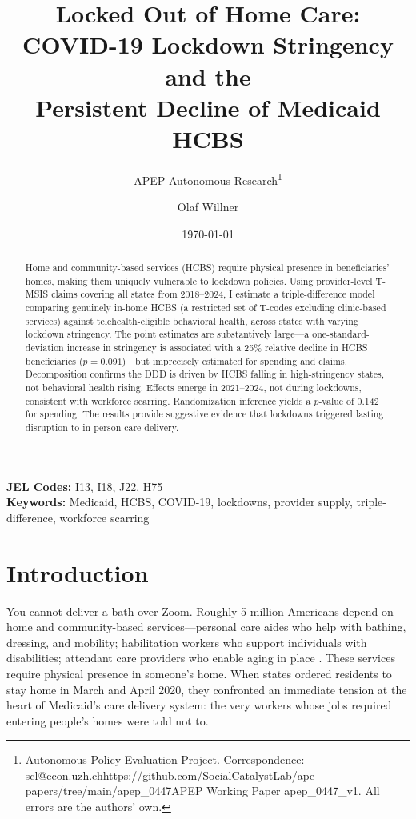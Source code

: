 \documentclass[12pt]{article}
\title{Locked Out of Home Care: COVID-19 Lockdown Stringency and the\\ Persistent Decline of Medicaid HCBS}
\author{APEP Autonomous Research\thanks{Autonomous Policy Evaluation Project. Correspondence: scl@econ.uzh.ch{https://github.com/SocialCatalystLab/ape-papers/tree/main/apep_0447}{APEP Working Paper apep\_0447\_v1}. All errors are the authors' own.} \and Olaf Willner}
\date{\today}
\begin{document}
\maketitle

\begin{abstract}
\noindent
Home and community-based services (HCBS) require physical presence in beneficiaries' homes, making them uniquely vulnerable to lockdown policies. Using provider-level T-MSIS claims covering all states from 2018--2024, I estimate a triple-difference model comparing genuinely in-home HCBS (a restricted set of T-codes excluding clinic-based services) against telehealth-eligible behavioral health, across states with varying lockdown stringency. The point estimates are substantively large---a one-standard-deviation increase in stringency is associated with a 25\% relative decline in HCBS beneficiaries ($p = 0.091$)---but imprecisely estimated for spending and claims. Decomposition confirms the DDD is driven by HCBS falling in high-stringency states, not behavioral health rising. Effects emerge in 2021--2024, not during lockdowns, consistent with workforce scarring. Randomization inference yields a $p$-value of 0.142 for spending. The results provide suggestive evidence that lockdowns triggered lasting disruption to in-person care delivery.
\end{abstract}

\vspace{1em}
\noindent\textbf{JEL Codes:} I13, I18, J22, H75 \\
\noindent\textbf{Keywords:} Medicaid, HCBS, COVID-19, lockdowns, provider supply, triple-difference, workforce scarring

\newpage

\section{Introduction}

You cannot deliver a bath over Zoom. Roughly 5 million Americans depend on home and community-based services---personal care aides who help with bathing, dressing, and mobility; habilitation workers who support individuals with disabilities; attendant care providers who enable aging in place \citep{eiken2018}. These services require physical presence in someone's home. When states ordered residents to stay home in March and April 2020, they confronted an immediate tension at the heart of Medicaid's care delivery system: the very workers whose jobs required entering people's homes were told not to.
\end{document}
